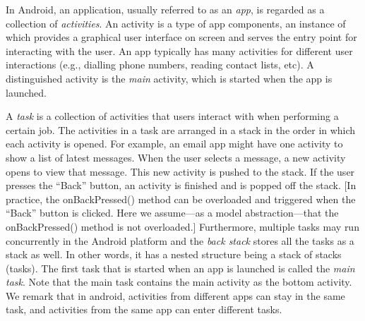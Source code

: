 
In Android, an application, usually referred to as an \emph{app}, is regarded as a collection of \emph{activities}. An activity is a type of app components, an instance of which provides a graphical user interface on screen and  serves the entry point for interacting with the user\cite{Androiddoc}. An app typically has many activities for different user interactions (e.g., dialling phone numbers, reading contact lists, etc). A distinguished activity is the \emph{main} activity, which is started when the app is launched.
%
 
 
A \emph{task} is a collection of activities that users interact with when performing a certain job.
The activities in a task are arranged in a stack %
in the order in which each activity is opened. For example, an email app might have one activity to show a list of latest messages. When the user selects a message, a new activity opens to view that message. This new activity is pushed to the stack. If the user presses the ``Back'' button, an activity is finished and is popped off the stack. [In practice, the onBackPressed() method can be overloaded and triggered when the ``Back'' button is clicked. Here we assume---as a model abstraction---that the onBackPressed() method is not overloaded.]
Furthermore, multiple tasks may run concurrently in the Android platform and the \emph{back stack} stores all the tasks as a stack as well. In other words, it has a nested structure being a stack of stacks (tasks). The first task that is started when an app is launched is called the \emph{main task}. Note that the main task contains the main activity as the bottom activity. 
%
We remark that %
in android, activities from different apps can stay in the same task, and activities from the same app can enter different tasks.

